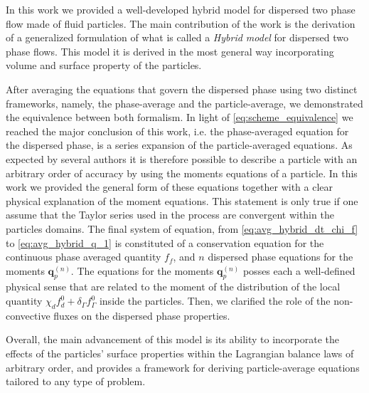 In this work we provided a well-developed hybrid model for dispersed two phase flow made of fluid particles.
The main contribution of the work is the derivation of a generalized formulation of what is called a \textit{Hybrid model} for dispersed two phase flows. 
This model it is derived in the most general way incorporating volume and surface property of the particles.

After averaging the equations that govern the dispersed phase using two distinct frameworks, namely, the phase-average and the particle-average, we demonstrated the equivalence between both formalism. 
In light of \ref{eq:scheme_equivalence} we reached the major conclusion of this work, i.e.  the phase-averaged equation for the dispersed phase, is a series expansion of the particle-averaged equations.  
As expected by several authors \citep{zhang1997momentum,nott2011suspension} it is therefore possible to describe a particle with an arbitrary order of accuracy by using the moments equations of a particle. 
In this work we provided the general form of these equations together with a clear physical explanation of the moment equations. 
This statement is only true if one assume that the Taylor series used in the process are convergent within the particles domains. 
The final system of equation, from \ref{eq:avg_hybrid_dt_chi_f} to \ref{eq:avg_hybrid_q_1} is constituted of a conservation equation for the continuous phase averaged quantity $f_f$, and $n$ dispersed phase equations for the moments $\textbf{q}_p^{(n)}$. 
The equations for the moments $\textbf{q}_p^{(n)}$ posses each a well-defined physical sense that are related to the moment of the distribution of the local quantity $\chi_df_d^0 + \delta_\Gamma f_\Gamma^0$ inside the particles. 
Then, we clarified the role of the non-convective fluxes on the dispersed phase properties. 

Overall, the main advancement of this model is its ability to incorporate the effects of the particles' surface properties within the Lagrangian balance laws of arbitrary order, and provides a framework for deriving particle-average equations tailored to any type of problem.
